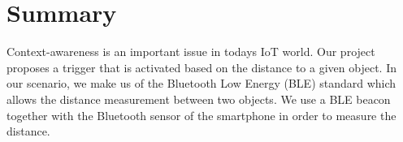\documentclass[
10pt, %
a4paper, %
oneside, %
headinclude,footinclude, %
BCOR5mm, %
]{scrartcl}
\title{\spacedallcaps{Distance Based Application Trigger}} %
\author{\small{Mehdi Yosofie, Philipp Schlieker}} %
\date{\today} %
\begin{document}

\renewcommand{\sectionmark}[1]{\markright{\spacedlowsmallcaps{#1}}} %
\lehead{\mbox{\llap{\small\thepage\kern1em\color{halfgray} \vline}\color{halfgray}\hspace{0.5em}\rightmark\hfil}} %

\pagestyle{scrheadings} %


\maketitle %

\setcounter{tocdepth}{2} %

\tableofcontents %




\section*{Summary} %

Context-awareness is an important issue in todays IoT world. Our project proposes a trigger that is activated based on the distance to a given object. In our scenario, we make us of the Bluetooth Low Energy (BLE) standard which allows the distance measurement between two objects. We use a BLE beacon together with the Bluetooth sensor of the smartphone in order to measure the distance. 
\end{document}
